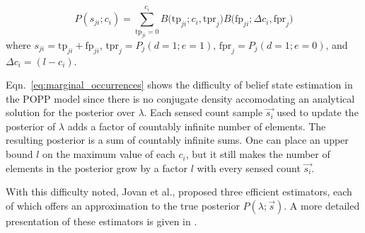 \begin{equation}
	\label{eq:joint_binomial_distribution}
    P(s_{ji} ; c_i) \! = \! \! \! \displaystyle\sum_{\textrm{tp}_{ji} = 0}^{c_{i}} \! \! B\Big(\textrm{tp}_{ji} ; c_i, \textrm{tpr}_j\Big) B\Big(\textrm{fp}_{ji} ; \Delta c_i, \textrm{fpr}_j \Big)
\end{equation}
\noindent where $s_{ji} = \textrm{tp}_{ji} + \textrm{fp}_{ji}$, $\textrm{tpr}_j = P_j(d=1 ; e=1)$, $\textrm{fpr}_j = P_j(d=1 ; e=0)$, and $\Delta c_i = (l - c_i)$.

Eqn.~\ref{eq:marginal_occurrences} shows the difficulty of belief state estimation in the POPP model since there is no conjugate density accomodating an analytical solution for the posterior over $\lambda$. Each sensed count sample $\overrightarrow{s_i}$ used to update the posterior of $\lambda$ adds a factor of countably infinite number of elements. The resulting posterior is a sum of countably infinite sums. One can place an upper bound $l$ on the maximum value of each $c_i$, but it still makes the number of elements in the posterior grow by a factor $l$ with every sensed count $\overrightarrow{s_i}$.  

With this difficulty noted, Jovan et al., proposed three efficient estimators, each of which offers an approximation to the true posterior $P(\lambda ; \overrightarrow{s})$. A more detailed presentation of these estimators is given in \cite{jovan18a}.
